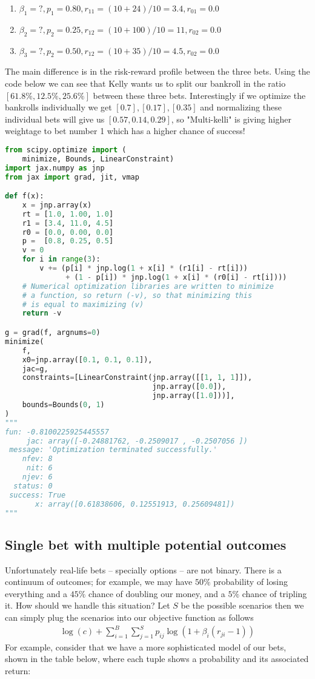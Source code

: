\documentclass{article}
\begin{document}
\begin{enumerate}
    \item $\beta_1=?, p_1=0.80, r_{11} = (10 + 24)/10 = 3.4, r_{01} = 0.0$
    \item $\beta_2=?, p_2=0.25, r_{12} = (10 + 100)/10 = 11, r_{02} = 0.0$
    \item $\beta_3=?, p_2=0.50, r_{12} = (10 + 35)/10 = 4.5, r_{02} = 0.0$
\end{enumerate}
The main difference is in the risk-reward profile between the three bets. Using the code below we can see that Kelly wants us to split our bankroll in the ratio $[61.8\%, 12.5\%, 25.6\%]$ between these three bets. Interestingly if we optimize the bankrolls individually we get $[0.7], [0.17], [0.35]$ and normalizing these individual bets will give us $[0.57, 0.14, 0.29]$, so "Multi-kelli" is giving higher weightage to bet number 1 which has a higher chance of success!
\begin{lstlisting}[language=Python]
from scipy.optimize import (
    minimize, Bounds, LinearConstraint)
import jax.numpy as jnp
from jax import grad, jit, vmap

def f(x):
    x = jnp.array(x)
    rt = [1.0, 1.00, 1.0]
    r1 = [3.4, 11.0, 4.5]
    r0 = [0.0, 0.00, 0.0]
    p =  [0.8, 0.25, 0.5]
    v = 0
    for i in range(3):
        v += (p[i] * jnp.log(1 + x[i] * (r1[i] - rt[i]))
              + (1 - p[i]) * jnp.log(1 + x[i] * (r0[i] - rt[i])))
    # Numerical optimization libraries are written to minimize
    # a function, so return (-v), so that minimizing this
    # is equal to maximizing (v)
    return -v

g = grad(f, argnums=0)
minimize(
    f,
    x0=jnp.array([0.1, 0.1, 0.1]), 
    jac=g, 
    constraints=[LinearConstraint(jnp.array([[1, 1, 1]]),
                                  jnp.array([0.0]),
                                  jnp.array([1.0]))],
    bounds=Bounds(0, 1)
)
"""
fun: -0.8100225925445557
     jac: array([-0.24881762, -0.2509017 , -0.2507056 ])
 message: 'Optimization terminated successfully.'
    nfev: 8
     nit: 6
    njev: 6
  status: 0
 success: True
       x: array([0.61838606, 0.12551913, 0.25609481])
"""
\end{lstlisting}

\subsection{Single bet with multiple potential outcomes}
Unfortunately real-life bets -- specially options -- are not binary. There is a continuum of outcomes; for example, we may have $50\%$ probability of losing everything and a $45\%$ chance of doubling our money, and a $5\%$ chance of tripling it. How should we handle this situation? Let $S$ be the possible scenarios then we can simply plug the scenarios into our objective function as follows
\begin{align}
\log(c) + \sum_{i=1}^B \sum_{j=1}^S p_{ij} \log(1 + \beta_i (r_{ji} -1)) 
\end{align}
For example, consider that we have a more sophisticated model of our bets, shown in the table below, where each tuple shows a probability and its associated return:
\end{document}
